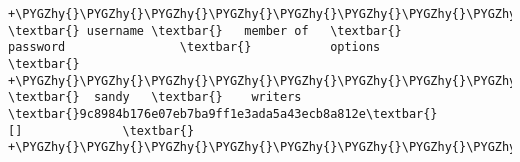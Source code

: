 \documentclass[letterpaper,10pt,english]{sphinxmanual}
\def\PYGZhy{\char`\-}
\begin{document}
\begin{Verbatim}[commandchars=\\\{\}]
+\PYGZhy{}\PYGZhy{}\PYGZhy{}\PYGZhy{}\PYGZhy{}\PYGZhy{}\PYGZhy{}\PYGZhy{}\PYGZhy{}\PYGZhy{}+\PYGZhy{}\PYGZhy{}\PYGZhy{}\PYGZhy{}\PYGZhy{}\PYGZhy{}\PYGZhy{}\PYGZhy{}\PYGZhy{}\PYGZhy{}\PYGZhy{}\PYGZhy{}\PYGZhy{}\PYGZhy{}\PYGZhy{}+\PYGZhy{}\PYGZhy{}\PYGZhy{}\PYGZhy{}\PYGZhy{}\PYGZhy{}\PYGZhy{}\PYGZhy{}\PYGZhy{}\PYGZhy{}\PYGZhy{}\PYGZhy{}\PYGZhy{}\PYGZhy{}\PYGZhy{}\PYGZhy{}\PYGZhy{}\PYGZhy{}\PYGZhy{}\PYGZhy{}\PYGZhy{}\PYGZhy{}\PYGZhy{}\PYGZhy{}\PYGZhy{}\PYGZhy{}\PYGZhy{}\PYGZhy{}\PYGZhy{}\PYGZhy{}\PYGZhy{}\PYGZhy{}\PYGZhy{}\PYGZhy{}\PYGZhy{}\PYGZhy{}\PYGZhy{}\PYGZhy{}\PYGZhy{}\PYGZhy{}+\PYGZhy{}\PYGZhy{}\PYGZhy{}\PYGZhy{}\PYGZhy{}\PYGZhy{}\PYGZhy{}\PYGZhy{}\PYGZhy{}\PYGZhy{}\PYGZhy{}\PYGZhy{}\PYGZhy{}\PYGZhy{}\PYGZhy{}\PYGZhy{}\PYGZhy{}\PYGZhy{}\PYGZhy{}\PYGZhy{}\PYGZhy{}\PYGZhy{}\PYGZhy{}\PYGZhy{}\PYGZhy{}\PYGZhy{}\PYGZhy{}\PYGZhy{}\PYGZhy{}\PYGZhy{}+
\textbar{} username \textbar{}   member of   \textbar{}                password                \textbar{}           options            \textbar{}
+\PYGZhy{}\PYGZhy{}\PYGZhy{}\PYGZhy{}\PYGZhy{}\PYGZhy{}\PYGZhy{}\PYGZhy{}\PYGZhy{}\PYGZhy{}+\PYGZhy{}\PYGZhy{}\PYGZhy{}\PYGZhy{}\PYGZhy{}\PYGZhy{}\PYGZhy{}\PYGZhy{}\PYGZhy{}\PYGZhy{}\PYGZhy{}\PYGZhy{}\PYGZhy{}\PYGZhy{}\PYGZhy{}+\PYGZhy{}\PYGZhy{}\PYGZhy{}\PYGZhy{}\PYGZhy{}\PYGZhy{}\PYGZhy{}\PYGZhy{}\PYGZhy{}\PYGZhy{}\PYGZhy{}\PYGZhy{}\PYGZhy{}\PYGZhy{}\PYGZhy{}\PYGZhy{}\PYGZhy{}\PYGZhy{}\PYGZhy{}\PYGZhy{}\PYGZhy{}\PYGZhy{}\PYGZhy{}\PYGZhy{}\PYGZhy{}\PYGZhy{}\PYGZhy{}\PYGZhy{}\PYGZhy{}\PYGZhy{}\PYGZhy{}\PYGZhy{}\PYGZhy{}\PYGZhy{}\PYGZhy{}\PYGZhy{}\PYGZhy{}\PYGZhy{}\PYGZhy{}\PYGZhy{}+\PYGZhy{}\PYGZhy{}\PYGZhy{}\PYGZhy{}\PYGZhy{}\PYGZhy{}\PYGZhy{}\PYGZhy{}\PYGZhy{}\PYGZhy{}\PYGZhy{}\PYGZhy{}\PYGZhy{}\PYGZhy{}\PYGZhy{}\PYGZhy{}\PYGZhy{}\PYGZhy{}\PYGZhy{}\PYGZhy{}\PYGZhy{}\PYGZhy{}\PYGZhy{}\PYGZhy{}\PYGZhy{}\PYGZhy{}\PYGZhy{}\PYGZhy{}\PYGZhy{}\PYGZhy{}+
\textbar{}  sandy   \textbar{}    writers    \textbar{}9c8984b176e07eb7ba9ff1e3ada5a43ecb8a812e\textbar{}              []              \textbar{}
+\PYGZhy{}\PYGZhy{}\PYGZhy{}\PYGZhy{}\PYGZhy{}\PYGZhy{}\PYGZhy{}\PYGZhy{}\PYGZhy{}\PYGZhy{}+\PYGZhy{}\PYGZhy{}\PYGZhy{}\PYGZhy{}\PYGZhy{}\PYGZhy{}\PYGZhy{}\PYGZhy{}\PYGZhy{}\PYGZhy{}\PYGZhy{}\PYGZhy{}\PYGZhy{}\PYGZhy{}\PYGZhy{}+\PYGZhy{}\PYGZhy{}\PYGZhy{}\PYGZhy{}\PYGZhy{}\PYGZhy{}\PYGZhy{}\PYGZhy{}\PYGZhy{}\PYGZhy{}\PYGZhy{}\PYGZhy{}\PYGZhy{}\PYGZhy{}\PYGZhy{}\PYGZhy{}\PYGZhy{}\PYGZhy{}\PYGZhy{}\PYGZhy{}\PYGZhy{}\PYGZhy{}\PYGZhy{}\PYGZhy{}\PYGZhy{}\PYGZhy{}\PYGZhy{}\PYGZhy{}\PYGZhy{}\PYGZhy{}\PYGZhy{}\PYGZhy{}\PYGZhy{}\PYGZhy{}\PYGZhy{}\PYGZhy{}\PYGZhy{}\PYGZhy{}\PYGZhy{}\PYGZhy{}+\PYGZhy{}\PYGZhy{}\PYGZhy{}\PYGZhy{}\PYGZhy{}\PYGZhy{}\PYGZhy{}\PYGZhy{}\PYGZhy{}\PYGZhy{}\PYGZhy{}\PYGZhy{}\PYGZhy{}\PYGZhy{}\PYGZhy{}\PYGZhy{}\PYGZhy{}\PYGZhy{}\PYGZhy{}\PYGZhy{}\PYGZhy{}\PYGZhy{}\PYGZhy{}\PYGZhy{}\PYGZhy{}\PYGZhy{}\PYGZhy{}\PYGZhy{}\PYGZhy{}\PYGZhy{}+
\end{Verbatim}
\end{document}
